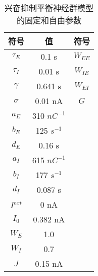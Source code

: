 \documentclass[lang=cn,a4paper,newtx]{elegantpaper}
\begin{document}
\begin{table}[htbp]
	\centering
	\small
	\caption{兴奋抑制平衡神经群模型的固定和自由参数}
	\begin{tabular}{ccc}
		\toprule
		符号         &        值  & 符号     \\
		\midrule
		$\tau_E$      &   0.1 s      &      $ W_{EE} $  \\
		$\tau_I$      &   0.01 s      &      $ W_{IE} $  \\
		$\gamma$      &   0.641 s      &      $ W_{EI} $  \\
		$\sigma$      &   0.01 nA      &      $ G $  \\
		$a_E$      &   310 $ nC^{-1} $      &       \\
		$b_E$      &   125 $ s^{-1} $      &       \\
		$d_E$      &   0.16 s      &       \\
		$a_I$      &   615 $ nC^{-1} $      &       \\
		$b_I$      &   177 $ s^{-1} $      &       \\
		$d_I$      &   0.087 s      &       \\
		$I^{ext}$      &   0 nA       &       \\
		$I_0$      &   0.382 nA      &       \\
		$W_E$      &   1.0       &       \\
		$W_I$      &   0.7       &       \\
		$J$      &   0.15 nA      &       \\
		
		\bottomrule
	\end{tabular}%
	\label{tab:BEI_parameters}%
\end{table}%




\nocite{*}
\printbibliography[heading=bibintoc, title=\ebibname]

\appendix
\addappheadtotoc
\end{document}
